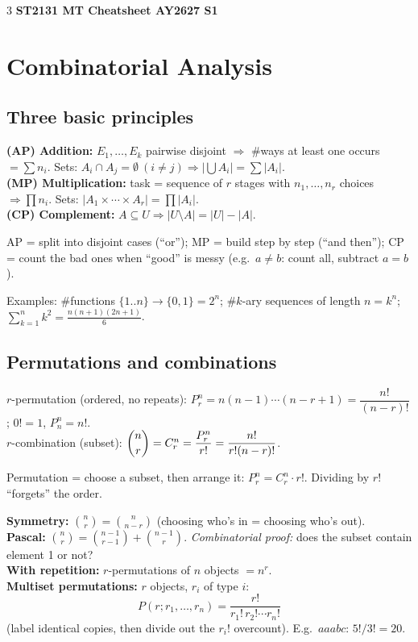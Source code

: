 \documentclass[8pt]{extarticle}
\begin{document}
\begin{multicols*}{3}
{\centering\large\bfseries ST2131 MT Cheatsheet AY2627 S1}

\section{Combinatorial Analysis}
\subsection{Three basic principles}
\textbf{(AP) Addition:} $E_1,\dots,E_k$ pairwise disjoint $\Rightarrow$ \#ways at least one occurs $=\sum n_i$. Sets: $A_i\cap A_j=\emptyset\ (i\ne j)\Rightarrow |\bigcup A_i|=\sum|A_i|$.\\
\textbf{(MP) Multiplication:} task = sequence of $r$ stages with $n_1,\dots,n_r$ choices $\Rightarrow \prod n_i$. Sets: $|A_1\times\cdots\times A_r|=\prod|A_i|$.\\
\textbf{(CP) Complement:} $A\subseteq U\Rightarrow |U\setminus A|=|U|-|A|$.
\begin{idea}AP = split into disjoint cases (``or''); MP = build step by step (``and then''); CP = count the bad ones when ``good'' is messy (e.g.\ $a\neq b$: count all, subtract $a=b$).\end{idea}
Examples: \#functions $\{1..n\}\to\{0,1\}=2^n$; \#$k$-ary sequences of length $n=k^n$; $\sum_{k=1}^n k^2=\tfrac{n(n+1)(2n+1)}{6}$.

\subsection{Permutations and combinations}
$r$-permutation (ordered, no repeats): $P^n_r=n(n-1)\cdots(n-r+1)=\dfrac{n!}{(n-r)!}$; $0!=1$, $P^n_n=n!$.\\
$r$-combination (subset): $\dbinom nr=C^n_r=\dfrac{P^n_r}{r!}=\dfrac{n!}{r!(n-r)!}$.
\begin{idea}Permutation = choose a subset, then arrange it: $P^n_r=C^n_r\cdot r!$. Dividing by $r!$ ``forgets'' the order.\end{idea}
\textbf{Symmetry:} $\binom nr=\binom n{n-r}$ (choosing who's in = choosing who's out).\\
\textbf{Pascal:} $\binom nr=\binom{n-1}{r-1}+\binom{n-1}r$. \emph{Combinatorial proof:} does the subset contain element 1 or not?\\
\textbf{With repetition:} $r$-permutations of $n$ objects $=n^r$.\\
\textbf{Multiset permutations:} $r$ objects, $r_i$ of type $i$:
\[P(r;r_1,\dots,r_n)=\frac{r!}{r_1!\,r_2!\cdots r_n!}\]
(label identical copies, then divide out the $r_i!$ overcount). E.g.\ $aaabc$: $5!/3!=20$.


\end{multicols*}
\end{document}
